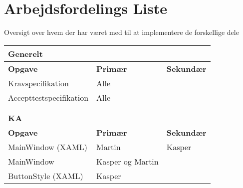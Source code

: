 \section{Arbejdsfordelings Liste}

Oversigt over hvem der har været med til at implementere de forskellige dele

\begin{table}[h]
\begin{tabular}{lll}

\hline
\multicolumn{3}{|l|}{{\color{lblue} \textbf{Generelt}}}                                                                                        \\ \hline
\multicolumn{1}{|l|}{\textbf{Opgave}}           & \multicolumn{1}{l|}{\textbf{Primær}}                       & \multicolumn{1}{l|}{\textbf{Sekundær}} \\ \hline
\multicolumn{1}{|l|}{Kravspecifikation}         & \multicolumn{1}{l|}{Alle}                                  & \multicolumn{1}{l|}{}                  \\ \hline
\multicolumn{1}{|l|}{Accepttestspecifikation}   & \multicolumn{1}{l|}{Alle}                                  & \multicolumn{1}{l|}{}                  \\ \hline
& & \\& & \\ \hline                                                    


\multicolumn{3}{|l|}{\color{lblue} \textbf{\gls{KA}}}                                                                                                               \\ \hline
\multicolumn{1}{|l|}{\textbf{Opgave}}           & \multicolumn{1}{l|}{\textbf{Primær}}                       & \multicolumn{1}{l|}{\textbf{Sekundær}} \\ \hline
\multicolumn{1}{|l|}{MainWindow (XAML)}         & \multicolumn{1}{l|}{Martin}                                  &
 \multicolumn{1}{l|}{Kasper}                  \\ \hline
 \multicolumn{1}{|l|}{MainWindow}         & \multicolumn{1}{l|}{Kasper og Martin}                                  & \multicolumn{1}{l|}{}                  \\ \hline
 
 \multicolumn{1}{|l|}{ButtonStyle (XAML)}         & \multicolumn{1}{l|}{Kasper}                                  & \multicolumn{1}{l|}{}                  \\ \hline
 

\end{tabular}
\end{table}
